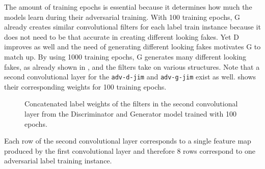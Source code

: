 \FloatBarrier
\noindent
The amount of training epochs is essential because it determines how much the models learn during their adversarial training.
With 100 training epochs, G already creates similar convolutional filters for each label train instance because it does not need to be that accurate in creating different looking fakes.
Yet D improves as well and the need of generating different looking fakes motivates G to match up.
By using 1000 training epochs, G generates many different looking fakes, as already shown in , and the filters take on various structures.
Note that a second convolutional layer for the \texttt{adv-d-jim} and \texttt{adv-g-jim} exist as well.
 shows their corresponding weights for 100 training epochs.
\begin{figure}[!ht]
  \centering
  \qquad \qquad
  \caption{Concatenated label weights of the filters in the second convolutional layer from the Discriminator and Generator model trained with 100 epochs.}
  \label{fig:nn_adv_label_weights_conv1}
\end{figure}
\FloatBarrier
\noindent
Each row of the second convolutional layer corresponds to a single feature map produced by the first convolutional layer and therefore 8 rows correspond to one adversarial label training instance.